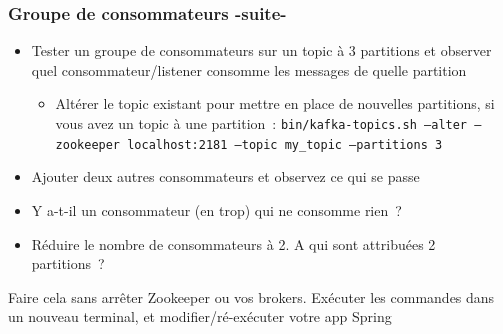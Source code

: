 \documentclass{beamer}
\begin{document}
\begin{frame}[fragile]
	\frametitle{Groupe de consommateurs -suite-}
	\begin{itemize}
		\item Tester un groupe de consommateurs sur un topic à 3 partitions et observer quel consommateur/listener consomme les messages de quelle partition
		\begin{itemize}
			\item Altérer le topic existant pour mettre en place de nouvelles partitions, si vous avez un topic à une partition~:
			\footnotesize
			\texttt{bin/kafka-topics.sh ---alter ---zookeeper localhost:2181 ---topic my\_topic ---partitions 3}
			\normalsize
		\end{itemize}
		\item Ajouter deux autres consommateurs et observez ce qui se passe
		\item Y a-t-il un consommateur (en trop) qui ne consomme rien~?		
		\item Réduire le nombre de consommateurs à 2. A qui sont attribuées 2 partitions~?
	\end{itemize}
Faire cela sans arrêter Zookeeper ou vos brokers. Exécuter les commandes dans un nouveau terminal, et modifier/ré-exécuter votre app Spring
\end{frame} 
\end{document}
